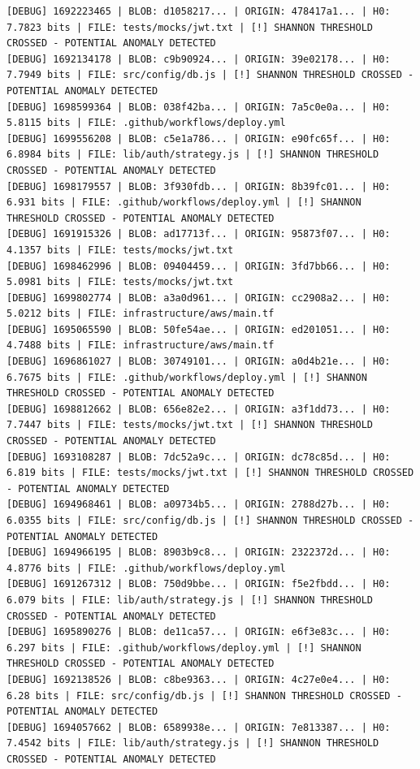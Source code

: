 \documentclass[12pt, a4paper, oneside]{report}
\begin{document}
\begin{lstlisting}[basicstyle=\tiny\ttfamily]
[DEBUG] 1692223465 | BLOB: d1058217... | ORIGIN: 478417a1... | H0: 7.7823 bits | FILE: tests/mocks/jwt.txt | [!] SHANNON THRESHOLD CROSSED - POTENTIAL ANOMALY DETECTED
[DEBUG] 1692134178 | BLOB: c9b90924... | ORIGIN: 39e02178... | H0: 7.7949 bits | FILE: src/config/db.js | [!] SHANNON THRESHOLD CROSSED - POTENTIAL ANOMALY DETECTED
[DEBUG] 1698599364 | BLOB: 038f42ba... | ORIGIN: 7a5c0e0a... | H0: 5.8115 bits | FILE: .github/workflows/deploy.yml
[DEBUG] 1699556208 | BLOB: c5e1a786... | ORIGIN: e90fc65f... | H0: 6.8984 bits | FILE: lib/auth/strategy.js | [!] SHANNON THRESHOLD CROSSED - POTENTIAL ANOMALY DETECTED
[DEBUG] 1698179557 | BLOB: 3f930fdb... | ORIGIN: 8b39fc01... | H0: 6.931 bits | FILE: .github/workflows/deploy.yml | [!] SHANNON THRESHOLD CROSSED - POTENTIAL ANOMALY DETECTED
[DEBUG] 1691915326 | BLOB: ad17713f... | ORIGIN: 95873f07... | H0: 4.1357 bits | FILE: tests/mocks/jwt.txt
[DEBUG] 1698462996 | BLOB: 09404459... | ORIGIN: 3fd7bb66... | H0: 5.0981 bits | FILE: tests/mocks/jwt.txt
[DEBUG] 1699802774 | BLOB: a3a0d961... | ORIGIN: cc2908a2... | H0: 5.0212 bits | FILE: infrastructure/aws/main.tf
[DEBUG] 1695065590 | BLOB: 50fe54ae... | ORIGIN: ed201051... | H0: 4.7488 bits | FILE: infrastructure/aws/main.tf
[DEBUG] 1696861027 | BLOB: 30749101... | ORIGIN: a0d4b21e... | H0: 6.7675 bits | FILE: .github/workflows/deploy.yml | [!] SHANNON THRESHOLD CROSSED - POTENTIAL ANOMALY DETECTED
[DEBUG] 1698812662 | BLOB: 656e82e2... | ORIGIN: a3f1dd73... | H0: 7.7447 bits | FILE: tests/mocks/jwt.txt | [!] SHANNON THRESHOLD CROSSED - POTENTIAL ANOMALY DETECTED
[DEBUG] 1693108287 | BLOB: 7dc52a9c... | ORIGIN: dc78c85d... | H0: 6.819 bits | FILE: tests/mocks/jwt.txt | [!] SHANNON THRESHOLD CROSSED - POTENTIAL ANOMALY DETECTED
[DEBUG] 1694968461 | BLOB: a09734b5... | ORIGIN: 2788d27b... | H0: 6.0355 bits | FILE: src/config/db.js | [!] SHANNON THRESHOLD CROSSED - POTENTIAL ANOMALY DETECTED
[DEBUG] 1694966195 | BLOB: 8903b9c8... | ORIGIN: 2322372d... | H0: 4.8776 bits | FILE: .github/workflows/deploy.yml
[DEBUG] 1691267312 | BLOB: 750d9bbe... | ORIGIN: f5e2fbdd... | H0: 6.079 bits | FILE: lib/auth/strategy.js | [!] SHANNON THRESHOLD CROSSED - POTENTIAL ANOMALY DETECTED
[DEBUG] 1695890276 | BLOB: de11ca57... | ORIGIN: e6f3e83c... | H0: 6.297 bits | FILE: .github/workflows/deploy.yml | [!] SHANNON THRESHOLD CROSSED - POTENTIAL ANOMALY DETECTED
[DEBUG] 1692138526 | BLOB: c8be9363... | ORIGIN: 4c27e0e4... | H0: 6.28 bits | FILE: src/config/db.js | [!] SHANNON THRESHOLD CROSSED - POTENTIAL ANOMALY DETECTED
[DEBUG] 1694057662 | BLOB: 6589938e... | ORIGIN: 7e813387... | H0: 7.4542 bits | FILE: lib/auth/strategy.js | [!] SHANNON THRESHOLD CROSSED - POTENTIAL ANOMALY DETECTED

\end{lstlisting}
\end{document}
